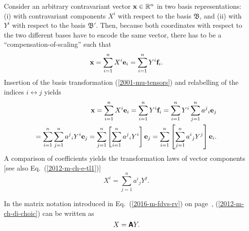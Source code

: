 Consider an arbitrary contravariant vector ${\bf x} \in {\Bbb R}^n$ in two basis representations:
(i)
with contravariant components $X^i$ with respect to the basis
${\mathfrak B}$,
and  (ii) with ${ Y }^i$  with respect to the basis
${\mathfrak B'}$.
Then, because both coordinates with respect to the two different bases
have to encode the same vector, there has to be a ``compensation-of-scaling'' such that
\begin{equation}
{\bf x}
=\sum_{i=1}^n X^i {\bf e}_i
=\sum_{i=1}^n { Y }^i {\bf f}_i
.
\end{equation}
Insertion of the basis transformation (\ref{2001-mu-tensors}) and
relabelling of the indices $i \leftrightarrow j$ yields
\begin{equation}
\begin{split}
{\bf x}
=\sum_{i=1}^n X^i {\bf e}_i
=\sum_{i=1}^n { Y }^i {\bf f}_i
=\sum_{i=1}^n { Y }^i \sum_{j=1}^n {a^j}_i {\bf e}_j\\
=
\sum_{i=1}^n\sum_{j=1}^n {a^j}_i { Y }^i  {\bf e}_j
=
\sum_{j=1}^n\left[ \sum_{i=1}^n {a^j}_i  { Y }^i \right] {\bf e}_j
=
\sum_{i=1}^n\left[ \sum_{j=1}^n {a^i}_j  { Y }^j \right] {\bf e}_i
.
\end{split}
\label{2016-m-ch-tensor-tcvc}
\end{equation}
A comparison of coefficients
yields the transformation laws of vector components
[see also Eq.~(\ref{2012-m-ch-e-tl1})]
\begin{equation}
X^i   = \sum_{j=1}^n {a^i}_j  { Y }^j .
\label{2012-m-ch-di-choic}
\end{equation}

In the matrix notation introduced in Eq.~(\ref{2016-m-fdvs-rv}) on page~\pageref{2016-m-fdvs-rv},
(\ref{2012-m-ch-di-choic}) can  be written as
\begin{equation}
X   =  \textsf{\textbf{A}}  Y .
\label{2016-m-ch-di-choic-mn}
\end{equation}



